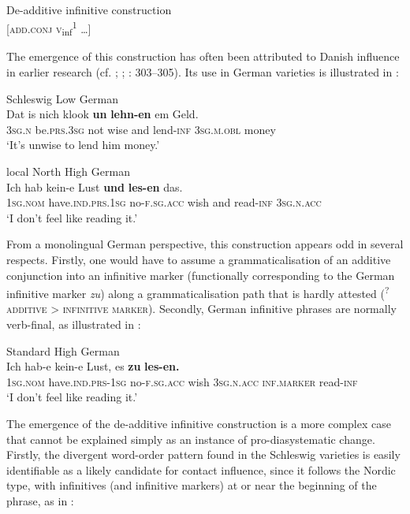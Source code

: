 \documentclass[output=paper]{langsci/langscibook}
\begin{document}
\ea
	\label{ex:hoeder:6}
	De-additive infinitive construction\\
       {[}\textsc{add.conj} \textsc{v}\textsubscript{inf}\textsuperscript{1} …{]}
     \z
       
The emergence of this construction has often been attributed to Danish influence in earlier research (cf. \citealt{Laur.1975}; \citealt{Hoekstra.2009}; \citealt{Hoder.2016b}: 303--305). Its use in German varieties is illustrated in :

 
\ea\label{ex:hoeder:7}
	\ea\label{ex:hoeder:7a}
 	 Schleswig Low German\\
	\gll Dat is nich{} klook \textbf{un} \textbf{lehn-en} em Geld.\\
     {\textsc{3sg.n}} be.\textsc{prs.3sg} not wise and lend-\textsc{inf} \textsc{3sg.m.obl} money\\
	\glt `It’s unwise to lend him money.'

	\ex\label{ex:hoeder:7b}
		local North High German\\
	\gll Ich hab{} kein-e Lust \textbf{und} \textbf{les-en} das.\\
     1\textsc{sg.nom} have.\textsc{ind.prs.}1\textsc{sg} no-\textsc{f.sg.acc} wish and read-\textsc{inf} 3\textsc{sg.n.acc}\\
	\glt `I don’t feel like reading it.'
\z
\z

From a monolingual German perspective, this construction appears odd in several respects. Firstly, one would have to assume a grammaticalisation of an additive conjunction into an infinitive marker (functionally corresponding to the German infinitive marker \textit{zu}) along a grammaticalisation path that is hardly attested (\textsuperscript{?}\textsc{additive} > \textsc{infinitive} \textsc{marker}). Secondly, German infinitive phrases are normally verb-final, as illustrated in :

\ea\label{ex:hoeder:8}
	Standard High German\\
	\gll Ich hab-e kein-e Lust,{} es \textbf{zu} \textbf{les-en.}\\
     1\textsc{sg.nom} have.\textsc{ind.prs}{}-1\textsc{sg} no\textsc{{}-f.sg.acc} wish 3\textsc{sg.n.acc} \textsc{inf.marker} read-\textsc{inf}\\
	\glt `I don’t feel like reading it.'
\z

The emergence of the de-additive infinitive construction is a more complex case that cannot be explained simply as an instance of pro-diasystematic change. Firstly, the divergent word-order pattern found in the Schleswig varieties is easily identifiable as a likely candidate for contact influence, since it follows the Nordic type, with infinitives (and infinitive markers) at or near the beginning of the phrase, as in :
\end{document}
